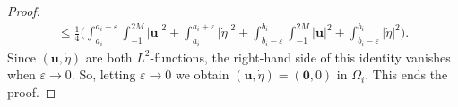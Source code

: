 \documentclass[JEP,XML,SOM,Unicode,NoFloatCountersInSection]{cedram}
\theoremstyle{remark}
\theoremstyle{definition}
\newcommand{\ug}{\boldsymbol{u}}
\newcommand{\BS}[1]{\boldsymbol{#1}}
\newcommand{\etap}{\dot{\eta}}
\begin{document}
\begin{proof}
\begin{multline}
\leq \frac{1}{4}\biggl(\int_{a_i}^{a_i+\varepsilon} \int_{-1}^{2M} \vert\ug\vert^{2}+\int_{a_i}^{a_i+\varepsilon}\vert\etap\vert^{2}
+\int_{b_i-\varepsilon}^{b_i} \int_{-1}^{2M} \vert\ug\vert^{2}+\int_{b_i-\varepsilon}^{b_i}\vert\etap\vert^{2} \biggr).
\end{multline}
Since $(\ug,\dot{\eta})$ are both $L^2$-functions, the right-hand side of this identity vanishes when $\varepsilon \to 0$. So, letting $\varepsilon\to 0$ we obtain $(\ug,\etap)=(\BS{0},0)$ in $\Omega_i$. This ends the proof.
\end{proof}

\backmatter


\end{document}
